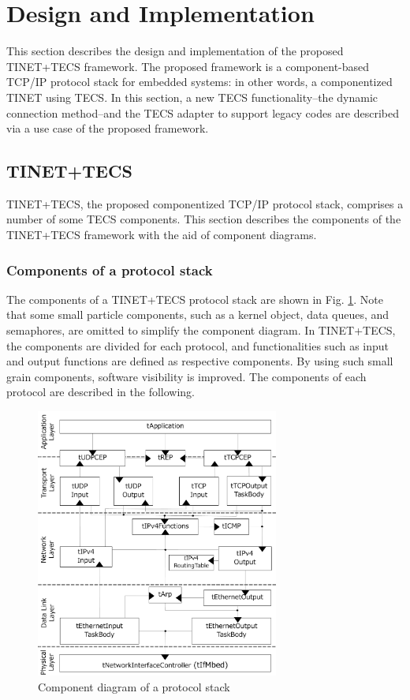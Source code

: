 \documentclass[conference]{IEEEtran/IEEEtran}
\begin{document}
\section{Design and Implementation}
\label{sec:Design and Implementation}

This section describes the design and implementation of the proposed TINET+TECS framework.
The proposed framework is a component-based TCP/IP protocol stack for embedded systems: in other words, a componentized TINET using TECS.
In this section, a new TECS functionality--the dynamic connection method--and the TECS adapter to support legacy codes are described via a use case of the proposed framework.

\subsection{TINET+TECS}
TINET+TECS, the proposed componentized TCP/IP protocol stack, comprises a number of some TECS components.
This section describes the components of the TINET+TECS framework with the aid of component diagrams.

\subsubsection{Components of a protocol stack}

The components of a TINET+TECS protocol stack are shown in Fig. \ref{fig:ComponentProtocolStack}.
Note that some small particle components, such as a kernel object, data queues, and semaphores, are omitted to simplify the component diagram.
In TINET+TECS, the components are divided for each protocol, and functionalities such as input and output functions are defined as respective components.
By using such small grain components, software visibility is improved.
The components of each protocol are described in the following.

\begin{figure}[t]
    \centering
    \includegraphics[width=8.0cm,clip]{figure/ComponentProtocolStack.pdf}
    \vspace{-1mm} \caption{Component diagram of a protocol stack}
    \vspace{-1mm} \label{fig:ComponentProtocolStack}
\end{figure}
\end{document}
